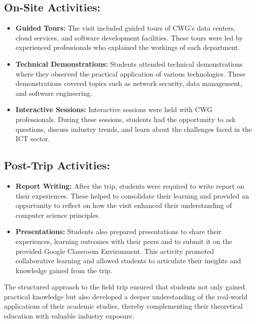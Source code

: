 \documentclass[a4paper,12pt]{report}
\begin{document}
\subsection{On-Site Activities:} 
    \begin{itemize}
        \item \textbf{Guided Tours:} The visit included guided tours of CWG’s data centers, cloud services, and software development facilities. These tours were led by experienced professionals who explained the workings of each department.
        \item \textbf{Technical Demonstrations:} Students attended technical demonstrations where they observed the practical application of various technologies. These demonstrations covered topics such as network security, data management, and software engineering.
        \item \textbf{Interactive Sessions:} Interactive sessions were held with CWG professionals. During these sessions, students had the opportunity to ask questions, discuss industry trends, and learn about the challenges faced in the ICT sector.
    \end{itemize}

\subsection{Post-Trip Activities:}
    \begin{itemize}
        \item \textbf{Report Writing:} After the trip, students were required to write report on their experiences. These helped to consolidate their learning and provided an opportunity to reflect on how the visit enhanced their understanding of computer science principles.
        \item \textbf{Presentations:} Students also prepared presentations to share their experiences, learning outcomes with their peers and to submit it on the provided Google Classroom Environment. This activity promoted collaborative learning and allowed students to articulate their insights and knowledge gained from the trip.
    \end{itemize}


The structured approach to the field trip ensured that students not only gained practical knowledge but also developed a deeper understanding of the real-world applications of their academic studies, thereby complementing their theoretical education with valuable industry exposure.
\end{document}

